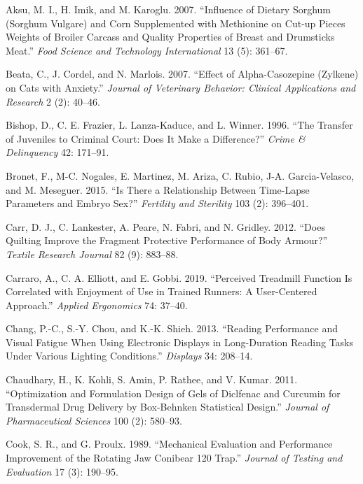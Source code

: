 \documentclass[
]{book}
\newlength{\cslhangindent}
\newenvironment{CSLReferences}[2] %
 {\begin{list}{}{%
  \setlength{\itemindent}{0pt}
  \setlength{\leftmargin}{0pt}
  \setlength{\parsep}{0pt}
  \ifodd #1
   \setlength{\leftmargin}{\cslhangindent}
   \setlength{\itemindent}{-1\cslhangindent}
  \fi
  \setlength{\itemsep}{#2\baselineskip}}}
 {\end{list}}
\begin{document}
\label{refs}
\begin{CSLReferences}{1}{0}
Aksu, M. I., H. Imik, and M. Karoglu. 2007. {``Influence of Dietary
Sorghum (Sorghum Vulgare) and Corn Supplemented with Methionine on
Cut-up Pieces Weights of Broiler Carcass and Quality Properties of
Breast and Drumsticks Meat.''} \emph{Food Science and Technology
International} 13 (5): 361--67.

Beata, C., J. Cordel, and N. Marlois. 2007. {``Effect of
Alpha-Casozepine (Zylkene) on Cats with Anxiety.''} \emph{Journal of
Veterinary Behavior: Clinical Applications and Research} 2 (2): 40--46.

Bishop, D., C. E. Frazier, L. Lanza-Kaduce, and L. Winner. 1996. {``The
Transfer of Juveniles to Criminal Court: Does It Make a Difference?''}
\emph{Crime \& Delinquency} 42: 171--91.

Bronet, F., M-C. Nogales, E. Martinez, M. Ariza, C. Rubio, J-A.
Garcia-Velasco, and M. Meseguer. 2015. {``Is There a Relationship
Between Time-Lapse Parameters and Embryo Sex?''} \emph{Fertility and
Sterility} 103 (2): 396--401.

Carr, D. J., C. Lankester, A. Peare, N. Fabri, and N. Gridley. 2012.
{``Does Quilting Improve the Fragment Protective Performance of Body
Armour?''} \emph{Textile Research Journal} 82 (9): 883--88.

Carraro, A., C. A. Elliott, and E. Gobbi. 2019. {``Perceived Treadmill
Function Is Correlated with Enjoyment of Use in Trained Runners: A
User-Centered Approach.''} \emph{Applied Ergonomics} 74: 37--40.

Chang, P.-C., S.-Y. Chou, and K.-K. Shieh. 2013. {``Reading Performance
and Visual Fatigue When Using Electronic Displays in Long-Duration
Reading Tasks Under Various Lighting Conditions.''} \emph{Displays} 34:
208--14.

Chaudhary, H., K. Kohli, S. Amin, P. Rathee, and V. Kumar. 2011.
{``Optimization and Formulation Design of Gels of Diclfenac and Curcumin
for Transdermal Drug Delivery by Box-Behnken Statistical Design.''}
\emph{Journal of Pharmaceutical Sciences} 100 (2): 580--93.

Cook, S. R., and G. Proulx. 1989. {``Mechanical Evaluation and
Performance Improvement of the Rotating Jaw Conibear 120 Trap.''}
\emph{Journal of Testing and Evaluation} 17 (3): 190--95.


\end{CSLReferences}
\end{document}
